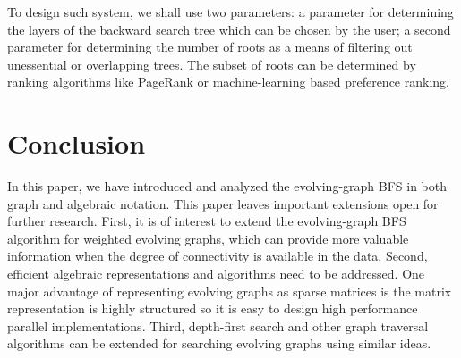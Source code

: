 \documentclass[11pt, conference, , compsocconf]{IEEEtran}
\theoremstyle{definition}
\begin{document}
To design such system, we shall use two parameters: 
 a parameter for 
determining the layers of the backward search tree which can be chosen by the user;
a second parameter for determining the number of roots as a means of 
filtering out unessential or overlapping trees. The subset of roots can be determined
by ranking algorithms like PageRank or machine-learning based preference ranking. 


\section{Conclusion}

In this paper, we have introduced and analyzed the evolving-graph BFS in both 
graph and algebraic notation. 
This paper leaves important extensions open for further research. First, it is 
of interest to extend the evolving-graph BFS algorithm for weighted evolving graphs, which can provide more valuable information when the degree of connectivity is available in the data. 
Second, efficient algebraic representations and algorithms need to be addressed. 
One major advantage of representing evolving graphs as sparse matrices
is the matrix representation is highly structured so it is easy to design
high performance parallel implementations. 
Third, depth-first search and other graph traversal algorithms can be 
extended for searching evolving graphs using similar ideas. 








%
%
%



 

\end{document}
